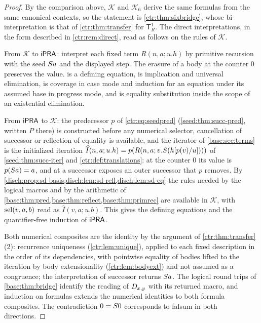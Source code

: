 \begin{proof}
By the comparison above, $\mathcal K$ and $\mathcal K_6$ derive the same
formulas from the same canonical contexts, so the statement is
\cref{ctr:thm:sixbridge}, whose bi-interpretation is that of
\cref{ctr:thm:transfer} for $\mathsf T_R^1$. The direct interpretations, in
the form described in \cref{ctr:rem:direct}, read as follows on the rules
of $\mathcal K$.

From $\mathcal K$ to $\mathsf{iPRA}$: interpret each fixed term $R(n,a;u.h)$ by
primitive recursion with the seed $S a$ and the displayed step. The
erasure of a body at the counter $0$ preserves the value. 
is a defining equation,  is implication and universal
elimination,  is coverage in case mode and induction for
an equation under its assumed base in progress mode, and 
is equality substitution inside the scope of an existential elimination.

From $\mathsf{iPRA}$ to $\mathcal K$: the predecessor $p$ of \eqref{ctr:eq:seedpred}
(\cref{seed:thm:succ-pred}, written $P$ there) is constructed before any
numerical selector, cancellation of successor or reflection of equality is
available, and the iterator of \cref{base:sec:terms} is the initialized
iteration $\widehat I(n,a;u.h)=p(R(n,a;v.S(h[p(v)/u])))$ of
\cref{seed:thm:succ-iter} and \cref{ctr:def:translations}: at the counter
$0$ its value is $p(S a)=a$, and at a successor  exposes
an outer successor that $p$ removes. By
\cref{disch:prop:sd-basis,disch:lem:sd-refl,disch:lem:sd-eq} the rules
needed by the logical macros and by the arithmetic of
\cref{base:thm:pred,base:thm:reflect,base:thm:primrec} are available in
$\mathcal K$, with $\operatorname{sel}(v,a,b)$ read as $\widehat I(v,a;u.b)$. This
gives the defining equations and the quantifier-free induction of $\mathsf{iPRA}$.

Both numerical composites are the identity by the argument of
\cref{ctr:thm:transfer}(2): recurrence uniqueness (\cref{ctr:lem:unique}),
applied to each fixed description in the order of its dependencies, with
pointwise equality of bodies lifted to the iteration by body
extensionality (\cref{ctr:lem:bodyext}) and not assumed as a congruence;
the interpretation of successor returns $S a$. The logical round trips
of \cref{base:thm:bridge} identify the reading of $D_{x,y}$ with its
returned macro, and induction on formulas extends the numerical
identities to both formula composites. The contradiction $0=S 0$
corresponds to falsum in both directions.
\end{proof}

